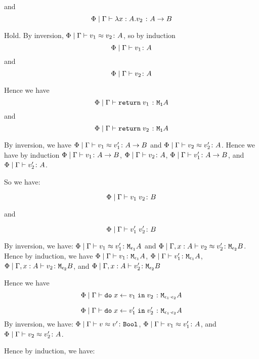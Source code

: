 {        and
        \begin{equation}
            \Phi\mid\Gamma \vdash \lambda x : A. v_2\; \colon A\rightarrow B
        \end{equation}

        Hold.
        By inversion, $\Phi\mid\Gamma \vdash v_1 \approx v_2 \colon A$, so by induction $$\Phi\mid\Gamma \vdash v_1 \colon A$$ and $$\Phi\mid\Gamma \vdash v_2 \colon A$$

        Hence we have $$\Phi\mid\Gamma \vdash \texttt{return} \; v_1\; \colon \texttt{M}_{\texttt{1}}{A}$$
        and
        $$\Phi\mid\Gamma \vdash \texttt{return} \; v_2\; \colon \texttt{M}_{\texttt{1}}{A}$$

        By inversion, we have $\Phi\mid\Gamma \vdash v_1 \approx v_1' \colon A\rightarrow B$ and $\Phi\mid\Gamma \vdash v_2 \approx v_2' \colon A$. Hence we have by induction $\Phi\mid\Gamma \vdash v_1 \colon A\rightarrow B$, $\Phi\mid\Gamma \vdash v_2 \colon A$, $\Phi\mid\Gamma \vdash v_1' \colon A\rightarrow B$, and $\Phi\mid\Gamma \vdash v_2' \colon A$.

        So we have:

        \begin{equation}
            \Phi\mid\Gamma \vdash v_1\; v_2 \colon B
        \end{equation}

        and

        
        \begin{equation}
            \Phi\mid\Gamma \vdash v_1'\; v_2' \colon B
        \end{equation}

        By inversion, we have:
        $\Phi\mid\Gamma \vdash v_1 \approx v_1' \colon \texttt{M}_{\epsilon_1}{A}$ and
        $\Phi\mid\Gamma, x: A \vdash v_2 \approx v_2' \colon \texttt{M}_{\epsilon_2}{B}$.
        Hence by induction, we have 
        $\Phi\mid\Gamma \vdash v_1 \colon \texttt{M}_{\epsilon_1}{A}$,
        $\Phi\mid\Gamma \vdash v_1' \colon \texttt{M}_{\epsilon_1}{A}$,
        $\Phi\mid\Gamma, x: A \vdash v_2 \colon \texttt{M}_{\epsilon_2}{B}$, and 
        $\Phi\mid\Gamma, x: A \vdash v_2' \colon \texttt{M}_{\epsilon_2}{B}$

        Hence we have 
        \begin{equation}
            \Phi\mid\Gamma \vdash \texttt{do}\; x \leftarrow v_1 \;\texttt{in}\; v_2\; \colon \texttt{M}_{\epsilon_1\cdot\epsilon_2}{A}
        \end{equation}

        
        \begin{equation}
            \Phi\mid\Gamma \vdash \texttt{do}\; x \leftarrow v_1' \;\texttt{in}\; v_2'\; \colon \texttt{M}_{\epsilon_1\cdot\epsilon_2}{A}
        \end{equation}
    By inversion, we have:
    $\Phi\mid\Gamma \vdash v \approx v' \colon \texttt{Bool}$,
    $\Phi\mid\Gamma \vdash v_1 \approx v_1' \colon A$, and
    $\Phi\mid\Gamma \vdash v_2 \approx v_2' \colon A$.

    Hence by induction, we have:

}
